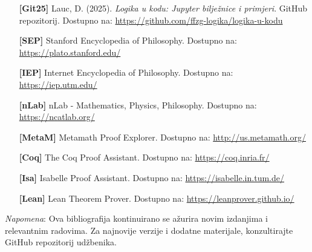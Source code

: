 \begin{itemize}[leftmargin=2cm, labelsep=0.5cm, itemsep=0.3cm]

\item[\textbf{[Git25]}] Lauc, D. (2025). \textit{Logika u kodu: Jupyter bilježnice i primjeri}. GitHub repozitorij. Dostupno na: \url{https://github.com/ffzg-logika/logika-u-kodu}

\item[\textbf{[SEP]}] Stanford Encyclopedia of Philosophy. Dostupno na: \url{https://plato.stanford.edu/}

\item[\textbf{[IEP]}] Internet Encyclopedia of Philosophy. Dostupno na: \url{https://iep.utm.edu/}

\item[\textbf{[nLab]}] nLab - Mathematics, Physics, Philosophy. Dostupno na: \url{https://ncatlab.org/}

\item[\textbf{[MetaM]}] Metamath Proof Explorer. Dostupno na: \url{http://us.metamath.org/}

\item[\textbf{[Coq]}] The Coq Proof Assistant. Dostupno na: \url{https://coq.inria.fr/}

\item[\textbf{[Isa]}] Isabelle Proof Assistant. Dostupno na: \url{https://isabelle.in.tum.de/}

\item[\textbf{[Lean]}] Lean Theorem Prover. Dostupno na: \url{https://leanprover.github.io/}

\end{itemize}

\vspace{1cm}

\noindent\textit{Napomena}: Ova bibliografija kontinuirano se ažurira novim izdanjima i relevantnim radovima. Za najnovije verzije i dodatne materijale, konzultirajte GitHub repozitorij udžbenika.